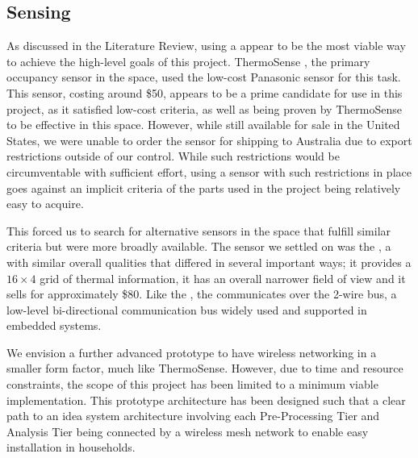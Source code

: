 \documentclass[../thesis/thesis.tex]{subfiles}
\begin{document}
\subsection{Sensing}
As discussed in the Literature Review, using a \iar appear to be the most viable way to achieve the high-level goals of this project. ThermoSense \cite{beltran2013thermosense}, the primary occupancy sensor in the \iar space, used the low-cost Panasonic \geye sensor for this task. This sensor, costing around \$50, appears to be a prime candidate for use in this project, as it satisfied low-cost criteria, as well as being proven by ThermoSense to be effective in this space. However, while still available for sale in the United States, we were unable to order the sensor for shipping to Australia due to export restrictions outside of our control. While such restrictions would be circumventable with sufficient effort, using a sensor with such restrictions in place goes against an implicit criteria of the parts used in the project being relatively easy to acquire.

This forced us to search for alternative sensors in the space that fulfill similar criteria but were more broadly available. The sensor we settled on was the \mlx \cite{MLXDatasheet}, a \iar with similar overall qualities that differed in several important ways; it provides a $16 \times 4$ grid of thermal information, it has an overall narrower field of view and it sells for approximately \$80. Like the \geye, the \mlx communicates over the 2-wire \iic bus, a low-level bi-directional communication bus widely used and supported in embedded systems.

We envision a further advanced prototype to have wireless networking in a smaller form factor, much like ThermoSense. However, due to time and resource constraints, the scope of this project has been limited to a minimum viable implementation. This prototype architecture has been designed such that a clear path to an idea system architecture involving each Pre-Processing Tier and Analysis Tier being connected by a wireless mesh network to enable easy installation in households.
\end{document}
